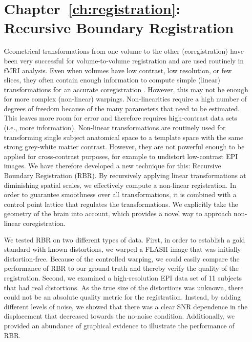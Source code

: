 \section*{Chapter~\ref{ch:registration}: Recursive Boundary Registration}
Geometrical transformations from one volume to the other (coregistration) have been very successful for volume-to-volume registration and are used routinely in fMRI analysis. Even when volumes have low contrast, low resolution, or few slices, they often contain enough information to compute simple (linear) transformations for an accurate coregistration \cite{Greve2009}. However, this may not be enough for more complex (non-linear) warpings. Non-linearities require a high number of degrees of freedom because of the many parameters that need to be estimated. This leaves more room for error and therefore requires high-contrast data sets (i.e., more information). Non-linear transformations are routinely used for transforming single subject anatomical space to a template space with the same strong grey-white matter contrast. However, they are not powerful enough to be applied for cross-contrast purposes, for example to undistort low-contrast EPI images. We have therefore developed a new technique for this: Recursive Boundary Registration (RBR). By recursively applying linear transformations at diminishing spatial scales, we effectively compute a non-linear registration. In order to guarantee smoothness over all transformations, it is combined with a control point lattice that regulates the transformations. We explicitly take the geometry of the brain into account, which provides a novel way to approach non-linear coregistration.

We tested RBR on two different types of data. First, in order to establish a gold standard with known distortions, we warped a FLASH image that was initially distortion-free. Because of the controlled warping, we could easily compare the performance of RBR to our ground truth and thereby verify the quality of the registration. Second, we examined a high-resolution EPI data set of 11 subjects that had real distortions. As the true size of the distortions was unknown, there could not be an absolute quality metric for the registration. Instead, by adding different levels of noise, we showed that there was a clear SNR dependence in the displacement that decreased towards the no-noise condition. Additionally, we provided an abundance of graphical evidence to illustrate the performance of RBR.

